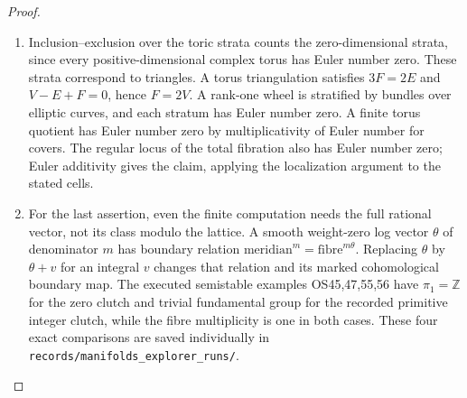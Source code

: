 \begin{proof}
\begin{enumerate}[label=\arabic*.,leftmargin=*]
\item Inclusion--exclusion over the toric strata counts the zero-dimensional
strata, since every positive-dimensional complex torus has Euler
number zero. These strata correspond to triangles. A torus
triangulation satisfies $3F=2E$ and $V-E+F=0$, hence $F=2V$.
A rank-one wheel is stratified by bundles over elliptic curves, and
each stratum has Euler number zero. A finite torus quotient has Euler
number zero by multiplicativity of Euler number for covers.
The regular locus of the total fibration also has Euler number zero;
Euler additivity gives the claim, applying the localization argument to the stated cells.

\item For the last assertion, even the finite computation needs the
full rational vector, not its class modulo the lattice. A smooth
weight-zero log vector $\theta$ of denominator $m$ has boundary
relation $\mathrm{meridian}^{m}=\mathrm{fibre}^{m\theta}$.
Replacing $\theta$ by $\theta+v$ for an integral $v$ changes that
relation and its marked cohomological boundary map. The executed
semistable examples OS45,47,55,56 have $\pi_1=\mathbb Z$ for the
zero clutch and trivial fundamental group for the recorded primitive
integer clutch, while the fibre multiplicity is one in both cases.
These four exact comparisons are saved individually in
\texttt{records/manifolds\_explorer\_runs/}.
\end{enumerate}
\end{proof}

